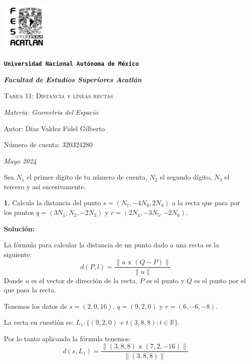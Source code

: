 \documentclass{article}
\begin{document}
\begin{titlepage}
    \centering   
    {\includegraphics[width=2.5cm]{logo.png}\par}
    {\texttt{\bfseries \LARGE Universidad Nacional Autónoma de México} \par}
    \vspace{1cm}
    {\itshape \Large \bfseries Facultad de Estudios Superiores Acatlán \par}
    \vspace{3cm}
    {\scshape \Huge Tarea 11: Distancia y líneas rectas\par}
    \vspace {3cm}
    {\slshape \Large Materia: Geometria del Espacio \par}
    \vspace{2cm}
    {\Large Autor: Díaz Valdez Fidel Gilberto\par}
    {\Large Número de cuenta: 320324280\par}
    \vfill
    {\itshape Mayo 2024 \par}
\end{titlepage}
Sea $N_1$ el primer dígito de tu número de cuenta, $N_2$ el segundo dígito, $N_3$ el tercero y así
sucesivamente.
\vspace{10pt}

\textbf{1.} Calcula la distancia del punto $s = (N_7, -4N_9, 2N_8)$ a la recta que pasa por los puntos $q = (3N_1, N_2, -2N_3)$ y 
$r= (2N_4, -3N_5,-2N_6)$.
\vspace{10pt}

\textbf{Solución:}
\vspace{10pt}

La fórmula para calcular la distancia de un punto dado a una recta es la siguiente:
$$d (P, l) = \frac{\|u \text{ x } (Q-P)\|}{\|u\|}$$
Donde $u$ es el vector de dirección de la recta, $P$ es el punto y $Q$ es el punto por el que pasa la recta. 

Tenemos los datos de $s = (2, 0, 16)$,  $q = (9, 2, 0)$ y $r= (6, -6,-8)$.

La recta en cuestión es: $L_1:\{(9, 2, 0)+t(3, 8, 8): t \in \mathbb{R}\}$.

Por lo tanto aplicando la fórmula tenemos:
$$d(s,L_1) = \frac{\|(3,8,8) \text{ x }(7,2,-16)\|}{\|(3, 8, 8)\|}$$
\end{document}
